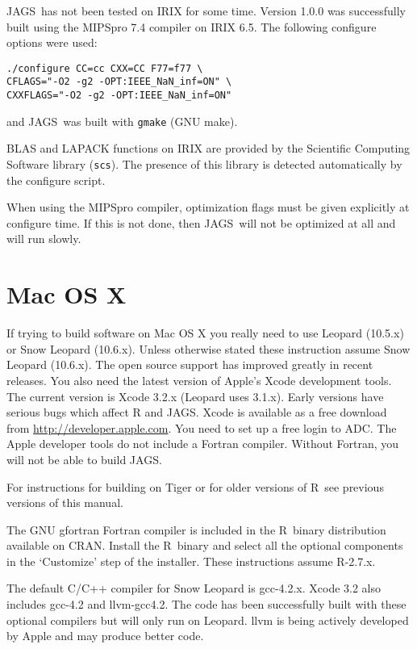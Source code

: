 \documentclass[11pt, a4paper, titlepage]{article}
\newcommand{\JAGS}{\textsf{JAGS}}
\newcommand{\R}{\textsf{R}}
\begin{document}
\JAGS\ has not been tested on IRIX for some time.  Version 1.0.0 was
successfully built using the MIPSpro 7.4 compiler on IRIX 6.5. The
following configure options were used:
\begin{verbatim}
./configure CC=cc CXX=CC F77=f77 \
CFLAGS="-O2 -g2 -OPT:IEEE_NaN_inf=ON" \
CXXFLAGS="-O2 -g2 -OPT:IEEE_NaN_inf=ON" 
\end{verbatim}
and \JAGS\ was built with \verb+gmake+ (GNU make).

BLAS and LAPACK functions on IRIX are provided by the Scientific
Computing Software library (\verb+scs+). The presence of this library
is detected automatically by the configure script.

When using the MIPSpro compiler, optimization flags must be given
explicitly at configure time. If this is not done, then \JAGS\ will
not be optimized at all and will run slowly.

\clearpage
\section{Mac OS X}

If trying to build software on Mac OS X you really need to use Leopard
(10.5.x) or Snow Leopard (10.6.x). Unless otherwise stated these
instruction assume Snow Leopard (10.6.x). The open source support has
improved greatly in recent releases. You also need the latest version
of Apple's Xcode development tools. The current version is Xcode 3.2.x
(Leopard uses 3.1.x).  Early versions have serious bugs which affect R
and \JAGS.  Xcode is available as a free download from
\url{http://developer.apple.com}. You need to set up a free login to
ADC. The Apple developer tools do not include a Fortran
compiler. Without Fortran, you will not be able to build \JAGS.

For instructions for building on Tiger or for older versions of
\R\ see previous versions of this manual.

The GNU gfortran Fortran compiler is included in the \R\ binary
distribution available on CRAN. Install the \R\ binary and select all
the optional components in the `Customize' step of the installer.
These instructions assume R-2.7.x.

The default C/C++ compiler for Snow Leopard is gcc-4.2.x. Xcode 3.2
also includes gcc-4.2 and llvm-gcc4.2.  The code has been successfully
built with these optional compilers but will only run on Leopard.
llvm is being actively developed by Apple and may produce better code.
\end{document}
